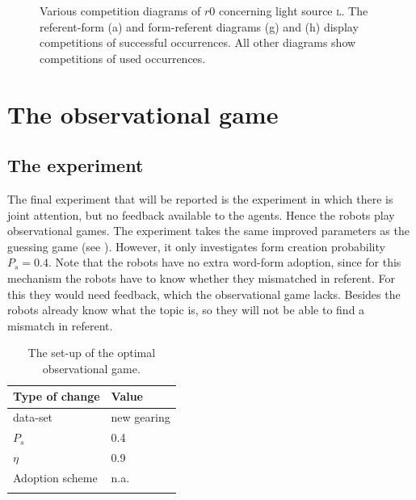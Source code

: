 \begin{figure}[p]
	\caption{Various competition diagrams of $r0$ concerning light source \textsc{l}. The referent-form (a) and form-referent diagrams (g) and (h) display competitions of successful occurrences. All other diagrams show competitions of used occurrences.}
	\label{f:opt:ggcomp2}
\end{figure}


\section{The observational game}\label{s:opt:oli}

\subsection{The experiment}

The final experiment that will be reported is the experiment in which there is joint attention, but no feedback available to the agents. Hence the robots play observational games. The experiment takes the same improved parameters as the guessing game (see ). However, it only investigates form creation probability $P_s=0.4$. Note that the robots have no extra word-form adoption, since for this mechanism the robots have to know whether they mismatched in referent. For this they would need feedback, which the observational game lacks. Besides the robots already know what the topic is, so they will not be able to find a mismatch in referent.

\begin{table}
\centering
\begin{tabular}{ll}
\lsptoprule
Type of change & Value\\\midrule
data-set & new gearing\\%
$P_s$ & 0.4\\%
$\eta$ & 0.9\\%
Adoption scheme & n.a.\\%
\lspbottomrule
\end{tabular}
\caption{The set-up of the optimal observational game. }
\label{t:opt:oli}
\end{table}


